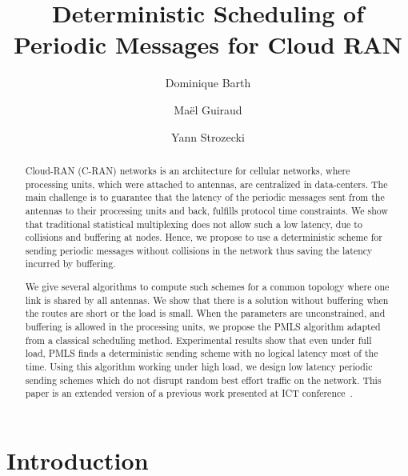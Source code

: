 \documentclass[10pt, conference, letterpaper]{IEEEtran}
\title{Deterministic Scheduling of Periodic Messages for Cloud RAN}
\author[1]{Dominique Barth}
\author[1,2]{Ma\"el Guiraud}
\author[1]{Yann Strozecki}
\affil[1]{David Laboratory, UVSQ}
\affil[2]{Nokia Bell Labs France}
\begin{document}
\maketitle

\begin{abstract}
Cloud-RAN (C-RAN) networks is an architecture for cellular networks, where processing units, which were attached to antennas, are centralized in data-centers. The main challenge is to guarantee that the latency of the periodic messages sent from the antennas to their processing units and back, fulfills protocol time constraints. We show that traditional statistical multiplexing does not allow such a low latency, due to collisions and buffering at nodes. Hence, we propose to use a deterministic scheme for sending periodic messages without collisions in the network thus saving the latency incurred by buffering.

We give several algorithms to compute such schemes for a common topology where one link is shared by all antennas. We show that there is a solution without buffering when the routes are short or the load is small. When the parameters are unconstrained, and buffering is allowed in the processing units, we propose the PMLS algorithm adapted from a classical scheduling method. Experimental results show that even under full load,  PMLS finds a deterministic sending scheme with no logical latency most of the time. Using this algorithm working under high load, we design low latency periodic sending schemes which do not disrupt random best effort traffic on the network. This paper is an extended version of a previous work presented at ICT conference~\cite{Guir1806:Deterministic}.
\end{abstract}


\section{Introduction}
\end{document}
